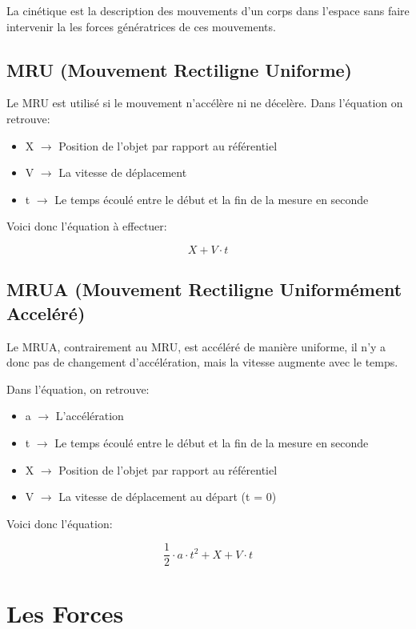 \documentclass{article}
\begin{document}
La cinétique est la description des mouvements d'un corps dans l'espace sans faire
intervenir la les forces génératrices de ces mouvements.

\subsection{MRU (Mouvement Rectiligne Uniforme)}

Le MRU est utilisé si le mouvement n'accélère ni ne décelère. Dans l'équation on retrouve:
\begin{itemize}
	\item X $\rightarrow$ Position de l'objet par rapport au référentiel
	\item V $\rightarrow$ La vitesse de déplacement
	\item t $\rightarrow$ Le temps écoulé entre le début et la fin de la mesure en seconde
\end{itemize}

Voici donc l'équation à effectuer:

\begin{equation}
  X + V \cdot t
\end{equation}

\subsection{MRUA (Mouvement Rectiligne Uniformément Acceléré)}

Le MRUA, contrairement au MRU, est accéléré de manière uniforme, il n'y a donc pas de changement d'accélération, mais la vitesse augmente avec le temps.

Dans l'équation, on retrouve:
\begin{itemize}
	\item a $\rightarrow$ L'accélération
	\item t $\rightarrow$ Le temps écoulé entre le début et la fin de la mesure en seconde
	\item X $\rightarrow$ Position de l'objet par rapport au référentiel
	\item V $\rightarrow$ La vitesse de déplacement au départ (t = 0)
\end{itemize}

Voici donc l'équation:

\begin{equation}
	\frac{1}{2} \cdot a \cdot t^2 + X + V \cdot t
\end{equation}

\pagebreak
\section{Les Forces}
\end{document}

